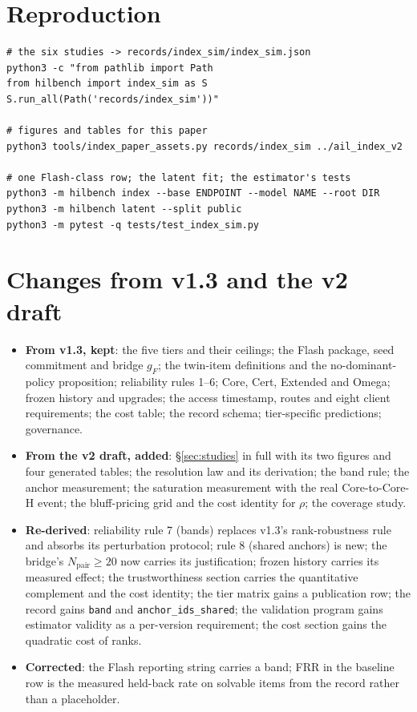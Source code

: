 \documentclass[11pt]{article}
\theoremstyle{definition}
\begin{document}
\section{Reproduction}\label{app:repro}
\begin{verbatim}
# the six studies -> records/index_sim/index_sim.json
python3 -c "from pathlib import Path
from hilbench import index_sim as S
S.run_all(Path('records/index_sim'))"

# figures and tables for this paper
python3 tools/index_paper_assets.py records/index_sim ../ail_index_v2

# one Flash-class row; the latent fit; the estimator's tests
python3 -m hilbench index --base ENDPOINT --model NAME --root DIR
python3 -m hilbench latent --split public
python3 -m pytest -q tests/test_index_sim.py
\end{verbatim}

\section{Changes from v1.3 and the v2 draft}\label{app:changes}
\begin{itemize}[itemsep=1pt]
\item \textbf{From v1.3, kept}: the five tiers and their ceilings; the Flash package, seed commitment and bridge $g_F$; the twin-item definitions and the no-dominant-policy proposition; reliability rules 1--6; Core, Cert, Extended and Omega; frozen history and upgrades; the access timestamp, routes and eight client requirements; the cost table; the record schema; tier-specific predictions; governance.
\item \textbf{From the v2 draft, added}: \S\ref{sec:studies} in full with its two figures and four generated tables; the resolution law and its derivation; the band rule; the anchor measurement; the saturation measurement with the real Core-to-Core-H event; the bluff-pricing grid and the cost identity for $\rho$; the coverage study.
\item \textbf{Re-derived}: reliability rule 7 (bands) replaces v1.3's rank-robustness rule and absorbs its perturbation protocol; rule 8 (shared anchors) is new; the bridge's $N_{\text{pair}} \ge 20$ now carries its justification; frozen history carries its measured effect; the trustworthiness section carries the quantitative complement and the cost identity; the tier matrix gains a publication row; the record gains \texttt{band} and \texttt{anchor\_ids\_shared}; the validation program gains estimator validity as a per-version requirement; the cost section gains the quadratic cost of ranks.
\item \textbf{Corrected}: the Flash reporting string carries a band; FRR in the baseline row is the measured held-back rate on solvable items from the record rather than a placeholder.
\end{itemize}
\end{document}
